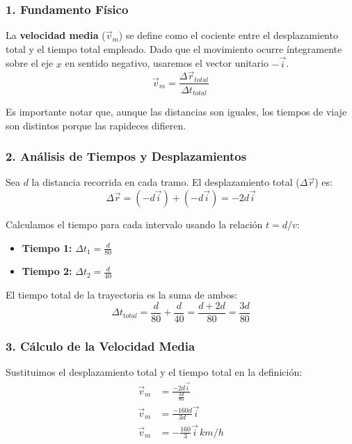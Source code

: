 \documentclass[12pt, a4paper]{article}
\begin{document}
\subsubsection*{1. Fundamento Físico}

La \textbf{velocidad media} ($\vec{v}_m$) se define como el cociente entre el desplazamiento total y el tiempo total empleado. Dado que el movimiento ocurre íntegramente sobre el eje $x$ en sentido negativo, usaremos el vector unitario $-\vec{i}$.
\begin{equation}
    \vec{v}_m = \frac{\Delta \vec{r}_{total}}{\Delta t_{total}}
\end{equation}

Es importante notar que, aunque las distancias son iguales, los tiempos de viaje son distintos porque las rapideces difieren.

\subsubsection*{2. Análisis de Tiempos y Desplazamientos}

Sea $d$ la distancia recorrida en cada tramo. El desplazamiento total ($\Delta \vec{r}$) es:
\begin{equation}
    \Delta \vec{r} = (-d \vec{i}) + (-d \vec{i}) = -2d \vec{i}
\end{equation}

Calculamos el tiempo para cada intervalo usando la relación $t = d/v$:
\begin{itemize}
    \item \textbf{Tiempo 1:} $\Delta t_1 = \frac{d}{80}$
    \item \textbf{Tiempo 2:} $\Delta t_2 = \frac{d}{40}$
\end{itemize}

El tiempo total de la trayectoria es la suma de ambos:
\begin{equation}
    \Delta t_{total} = \frac{d}{80} + \frac{d}{40} = \frac{d + 2d}{80} = \frac{3d}{80}
\end{equation}

\subsubsection*{3. Cálculo de la Velocidad Media}

Sustituimos el desplazamiento total y el tiempo total en la definición:
\begin{align*}
    \vec{v}_m &= \frac{-2d \vec{i}}{\frac{3d}{80}} \\
    \vec{v}_m &= \frac{-160d}{3d} \vec{i} \\
    \vec{v}_m &= -\frac{160}{3} \vec{i} \, \si{km/h}
\end{align*}
\end{document}
